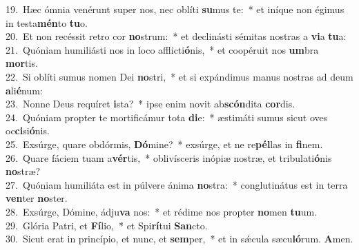 {19.~}Hæc ómnia venérunt super nos, nec oblíti \textbf{su}mus te:~* et iníque non égimus in testa\textbf{mén}to \textbf{tu}o.\\
{20.~}Et non recéssit retro cor \textbf{no}strum:~* et declinásti sémitas nostras a \textbf{vi}a \textbf{tu}a:\\
{21.~}Quóniam humiliásti nos in loco afflicti\textbf{ó}nis,~* et coopéruit nos \textbf{um}bra \textbf{mor}tis.\\
{22.~}Si oblíti sumus nomen Dei \textbf{no}stri,~* et si expándimus manus nostras ad deum \textbf{a}li\textbf{é}num:\\
{23.~}Nonne Deus requíret \textbf{i}sta?~* ipse enim novit ab\textbf{scón}dita \textbf{cor}dis.\\
{24.~}Quóniam propter te mortificámur tota \textbf{di}e:~* æstimáti sumus sicut oves oc\textbf{ci}si\textbf{ó}nis.\\
{25.~}Exsúrge, quare obdórmis, \textbf{Dó}mine?~* exsúrge, et ne re\textbf{pél}las in \textbf{fi}nem.\\
{26.~}Quare fáciem tuam a\textbf{vér}tis,~* oblivísceris inópiæ nostræ, et tribulati\textbf{ó}nis \textbf{no}stræ?\\
{27.~}Quóniam humiliáta est in púlvere ánima \textbf{no}stra:~* conglutinátus est in terra \textbf{ven}ter \textbf{no}ster.\\
{28.~}Exsúrge, Dómine, ádju\textbf{va} nos:~* et rédime nos propter \textbf{no}men \textbf{tu}um.\\
{29.~}Glória Patri, et \textbf{Fí}lio,~* et Spi\textbf{rí}tui \textbf{San}cto.\\
{30.~}Sicut erat in princípio, et nunc, et \textbf{sem}per,~* et in sǽcula sæcu\textbf{ló}rum. \textbf{A}men.\\
